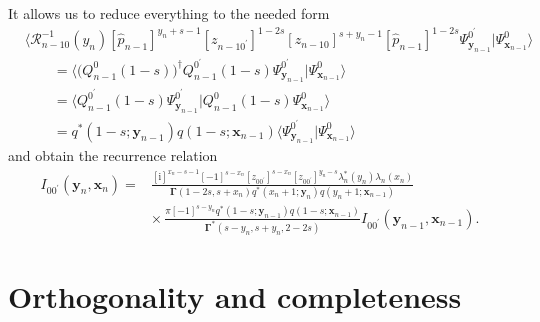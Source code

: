 \documentclass[10pt,a4paper]{amsart}
\renewcommand{\imath}{\mathrm{i}}
\numberwithin{equation}{section}
\begin{document}
It allows us to reduce everything to the needed form
\begin{align*}
&
\bigl\langle \mathcal{R}^{-1}_{n-1 0}(y_n)
[\hat{p}_{n-1}]^{y_n+s-1}
[z_{n-1 0^{\prime}}]^{1-2s} [z_{n-1 0}]^{s+y_n-1}
 [\hat{p}_{n-1}]^{1-2s} \Psi^{0^{\prime}}_{\bm{y}_{n-1}}|
\Psi^{0}_{\bm{x}_{n-1}}\bigr\rangle \\
& \qquad =
\bigl\langle
\bigl(Q^{0}_{n-1}(1-s)\bigr)^{\dagger}
Q^{0^{\prime}}_{n-1}(1-s)
 \Psi^{0^{\prime}}_{\bm{y}_{n-1}}|
\Psi^{0}_{\bm{x}_{n-1}}\bigr\rangle \\
& \qquad =
\bigl\langle
Q^{0^{\prime}}_{n-1}(1-s)
 \Psi^{0^{\prime}}_{\bm{y}_{n-1}}|
Q^{0}_{n-1}(1-s) \Psi^{0}_{\bm{x}_{n-1}}\bigr\rangle \\
& \qquad =
q^*(1-s;\bm{y}_{n-1}) q(1-s;\bm{x}_{n-1})
\bigl\langle
\Psi^{0^{\prime}}_{\bm{y}_{n-1}}|
\Psi^{0}_{\bm{x}_{n-1}}\bigr\rangle
\end{align*}
and obtain the recurrence relation
\begin{align*}
I_{0 0^{\prime}}(\bm{y}_n,\bm{x}_{n}) ={}&
\frac{[\imath]^{x_n-s-1} [-1]^{s-x_n} [z_{0 0^{\prime}}]^{s-x_n}
[z_{0 0^{\prime}}]^{y_n-s} \lambda_n^\ast(y_n) \lambda_n(x_n)}
{\mathbf{\Gamma}(1-2s,s+x_n) q^{*}(x_n+1;\bm{y}_n) q(y_n+1;\bm{x}_{n-1})} \\
& {\times}\,
\frac{\pi [-1]^{s-y_n} q^*(1-s;\bm{y}_{n-1})
q(1-s;\bm{x}_{n-1})}{\mathbf{\Gamma}^{*}(s-y_n,s+y_n,2-2s)}
I_{0 0^{\prime}}(\bm{y}_{n-1},\bm{x}_{n-1}) .
\end{align*}

\section{Orthogonality and completeness}
\label{sect:Ort}
\end{document}
